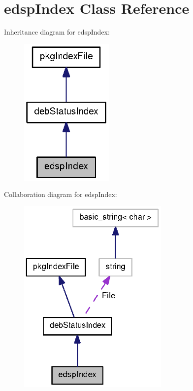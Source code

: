 \section{edsp\-Index \-Class \-Reference}
\label{classedspIndex}


\-Inheritance diagram for edsp\-Index\-:
\nopagebreak
\begin{figure}[H]
\begin{center}
\leavevmode
\includegraphics[width=130pt]{classedspIndex__inherit__graph}
\end{center}
\end{figure}


\-Collaboration diagram for edsp\-Index\-:
\nopagebreak
\begin{figure}[H]
\begin{center}
\leavevmode
\includegraphics[width=209pt]{classedspIndex__coll__graph}
\end{center}
\end{figure}
